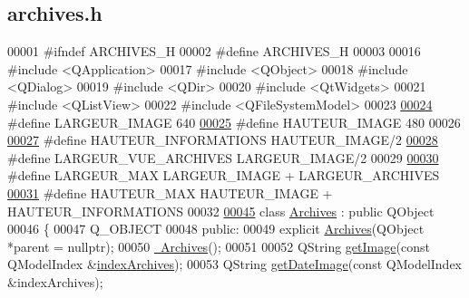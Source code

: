 \hypertarget{archives_8h_source}{}\subsection{archives.\+h}

\begin{DoxyCode}
00001 \textcolor{preprocessor}{#ifndef ARCHIVES\_H}
00002 \textcolor{preprocessor}{#define ARCHIVES\_H}
00003 
00016 \textcolor{preprocessor}{#include <QApplication>}
00017 \textcolor{preprocessor}{#include <QObject>}
00018 \textcolor{preprocessor}{#include <QDialog>}
00019 \textcolor{preprocessor}{#include <QDir>}
00020 \textcolor{preprocessor}{#include <QtWidgets>}
00021 \textcolor{preprocessor}{#include <QListView>}
00022 \textcolor{preprocessor}{#include <QFileSystemModel>}
00023 
\hyperlink{archives_8h_a91b2ba83eb56bef256a8a8633464a620}{00024} \textcolor{preprocessor}{#define LARGEUR\_IMAGE 640}
\hyperlink{archives_8h_ad4fba93bc733aa578ac9745e0d5020ff}{00025} \textcolor{preprocessor}{#define HAUTEUR\_IMAGE 480}
00026 
\hyperlink{archives_8h_aa94c23cbff6b265835c411d3d5107ea6}{00027} \textcolor{preprocessor}{#define HAUTEUR\_INFORMATIONS HAUTEUR\_IMAGE/2}
\hyperlink{archives_8h_a3604fbf2e89fe603190498c5b80063cb}{00028} \textcolor{preprocessor}{#define LARGEUR\_VUE\_ARCHIVES LARGEUR\_IMAGE/2}
00029 
\hyperlink{archives_8h_ae54d583f924fab9162d76d4cf1a17ded}{00030} \textcolor{preprocessor}{#define LARGEUR\_MAX LARGEUR\_IMAGE + LARGEUR\_ARCHIVES}
\hyperlink{archives_8h_af065ba7916b6677fb748e5332def30a3}{00031} \textcolor{preprocessor}{#define HAUTEUR\_MAX HAUTEUR\_IMAGE + HAUTEUR\_INFORMATIONS}
00032 
\hyperlink{class_archives}{00045} \textcolor{keyword}{class }\hyperlink{class_archives}{Archives} : \textcolor{keyword}{public} QObject
00046 \{
00047     Q\_OBJECT
00048 \textcolor{keyword}{public}:
00049     \textcolor{keyword}{explicit} \hyperlink{class_archives_ac30edd63c3f6c0df583bab7b9b9b4c76}{Archives}(QObject *parent = \textcolor{keyword}{nullptr});
00050     \hyperlink{class_archives_a08c9ded9bb3da731991c5526dcdb2548}{~Archives}();
00051 
00052     QString \hyperlink{class_archives_a9e35a0ff2d5823819cd2a9f8019c7b33}{getImage}(\textcolor{keyword}{const} QModelIndex &\hyperlink{class_archives_a31cba52f3979585ee5e2b9390d21322b}{indexArchives});
00053     QString \hyperlink{class_archives_a5c1d731519acde8b59bc79973c4c1287}{getDateImage}(\textcolor{keyword}{const} QModelIndex &indexArchives);

\end{DoxyCode}
